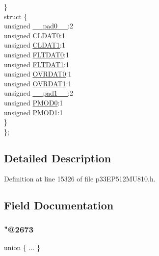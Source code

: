 \begin{DoxyCompactItemize}
\begin{tabbing}
\>\} \\
\>struct \{\\
\>\>unsigned \hyperlink{structtag_i_o_c_o_n6_b_i_t_s_adf71f3d8410c1f1dbbc96680a92c49af}{\_\_pad0\_\_}:2\\
\>\>unsigned \hyperlink{structtag_i_o_c_o_n6_b_i_t_s_a524fe5d7c4f19a9e5bab6fdae8cb6113}{CLDAT0}:1\\
\>\>unsigned \hyperlink{structtag_i_o_c_o_n6_b_i_t_s_abd730465de1cbb6fd169fef4c9f97b9e}{CLDAT1}:1\\
\>\>unsigned \hyperlink{structtag_i_o_c_o_n6_b_i_t_s_a154c32b551ecc420f476def330e87abd}{FLTDAT0}:1\\
\>\>unsigned \hyperlink{structtag_i_o_c_o_n6_b_i_t_s_a76d169f1247080fb508c7b31f62e89ab}{FLTDAT1}:1\\
\>\>unsigned \hyperlink{structtag_i_o_c_o_n6_b_i_t_s_a45d53d0768dd2659f98447ad77cc91b1}{OVRDAT0}:1\\
\>\>unsigned \hyperlink{structtag_i_o_c_o_n6_b_i_t_s_a095c02d71ec41de4ed9985a86207253f}{OVRDAT1}:1\\
\>\>unsigned \hyperlink{structtag_i_o_c_o_n6_b_i_t_s_acaf2d0924a107ec6e8d2e31febaf66f9}{\_\_pad1\_\_}:2\\
\>\>unsigned \hyperlink{structtag_i_o_c_o_n6_b_i_t_s_ac125b1e88bd44f7f044dcb0185cfb781}{PMOD0}:1\\
\>\>unsigned \hyperlink{structtag_i_o_c_o_n6_b_i_t_s_a961c1af920bb390a3b4ff925e45fa059}{PMOD1}:1\\
\>\} \\
\}; \\

\end{tabbing}\end{DoxyCompactItemize}


\subsection{Detailed Description}


Definition at line 15326 of file p33\+E\+P512\+M\+U810.\+h.



\subsection{Field Documentation}
\mbox{\label{structtag_i_o_c_o_n6_b_i_t_s_a4728322d9b441ec2975ea0a1cb8bd62b}} 
\subsubsection{\texorpdfstring{"@2673}{@2673}}
{\footnotesize\ttfamily union \{ ... \} }

